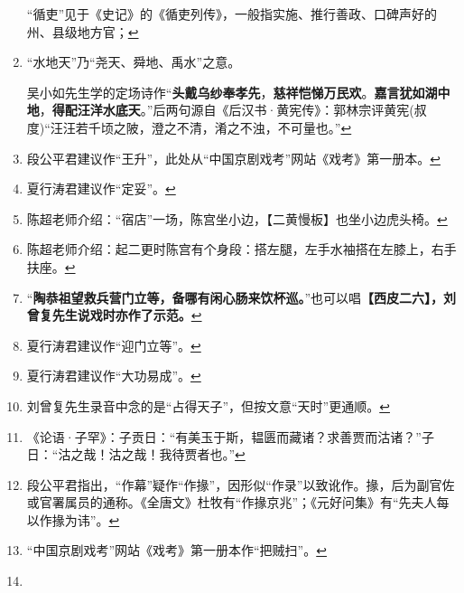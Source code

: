 \begin{enumerate}
  ``循吏''见于《史记》的《循吏列传》，一般指实施、推行善政、口碑声好的州、县级地方官；\protect\hyperlink{fnref138}{↩}
\item
  \leavevmode\hypertarget{fn139}{}%
  ``水地天''乃``尧天、舜地、禹水''之意。

  吴小如先生学的定场诗作``\textbf{头戴乌纱奉孝先}，\textbf{慈祥恺悌万民欢}。\textbf{嘉言犹如湖中地}，\textbf{得配汪洋水底天}。''后两句源自《后汉书·黄宪传》：郭林宗评黄宪(叔度)``汪汪若千顷之陂，澄之不清，淆之不浊，不可量也。''\protect\hyperlink{fnref139}{↩}
\item
  \leavevmode\hypertarget{fn140}{}%
  段公平君建议作``王升''，此处从``中国京剧戏考''网站《戏考》第一册本。\protect\hyperlink{fnref140}{↩}
\item
  \leavevmode\hypertarget{fn141}{}%
  夏行涛君建议作``定妥''。\protect\hyperlink{fnref141}{↩}
\item
  \leavevmode\hypertarget{fn142}{}%
  陈超老师介绍：``宿店''一场，陈宫坐小边，【二黄慢板】也坐小边虎头椅。\protect\hyperlink{fnref142}{↩}
\item
  \leavevmode\hypertarget{fn143}{}%
  陈超老师介绍：起二更时陈宫有个身段：搭左腿，左手水袖搭在左膝上，右手扶座。\protect\hyperlink{fnref143}{↩}
\item
  \leavevmode\hypertarget{fn144}{}%
  ``\textbf{陶恭祖望救兵营门立等，备哪有闲心肠来饮杯巡。}''也可以唱\textbf{【西皮二六】，刘曾复先生说戏时亦作了示范。}\protect\hyperlink{fnref144}{↩}
\item
  \leavevmode\hypertarget{fn145}{}%
  夏行涛君建议作``迎门立等''。\protect\hyperlink{fnref145}{↩}
\item
  \leavevmode\hypertarget{fn146}{}%
  夏行涛君建议作``大功易成''。\protect\hyperlink{fnref146}{↩}
\item
  \leavevmode\hypertarget{fn147}{}%
  刘曾复先生录音中念的是``占得天子''，但按文意``天时''更通顺。\protect\hyperlink{fnref147}{↩}
\item
  \leavevmode\hypertarget{fn148}{}%
  《论语·子罕》：子贡日：``有美玉于斯，韫匮而藏诸？求善贾而沽诸？''子日：``沽之哉！沽之哉！我待贾者也。''\protect\hyperlink{fnref148}{↩}
\item
  \leavevmode\hypertarget{fn149}{}%
  段公平君指出，``作幕''疑作``作掾''，因形似``作录''以致讹作。掾，后为副官佐或官署属员的通称。《全唐文》杜牧有``作掾京兆''；《元好问集》有``先夫人每以作掾为讳''。\protect\hyperlink{fnref149}{↩}
\item
  \leavevmode\hypertarget{fn150}{}%
  ``中国京剧戏考''网站《戏考》第一册本作``把贼扫''。\protect\hyperlink{fnref150}{↩}
\item

\end{enumerate}
